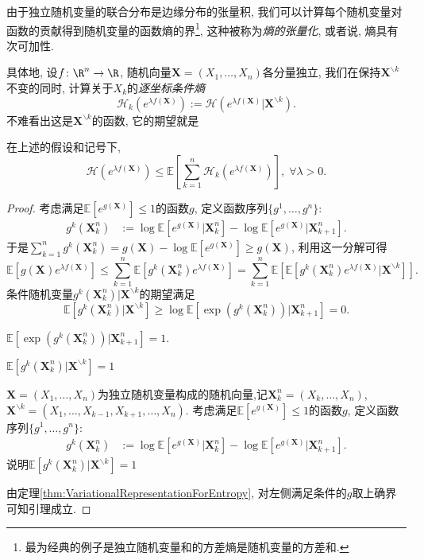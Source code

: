 由于独立随机变量的联合分布是边缘分布的张量积, 我们可以计算每个随机变量对函数的贡献得到随机变量的函数熵的界\footnote{最为经典的例子是独立随机变量和的方差熵是随机变量的方差和.}, 这种被称为\emph{熵的张量化}, 或者说, 熵具有次可加性. 


具体地, 设$f \colon \R^n \to \R$, 随机向量$\bm X = (X_1, \dots, X_n)$各分量独立, 我们在保持$\bm X^{\backslash k}$不变的同时, 计算关于$X_k$的\emph{逐坐标条件熵}
\begin{equation*}
	\mathcal{H}_k ( e^{\lambda f(\bm X)} )
	:= \mathcal{H} ( e^{\lambda f(\bm X)} | \bm X^{\backslash k} ). 
\end{equation*}
不难看出这是$\bm X^{\backslash k}$的函数, 它的期望就是

\begin{lemma}[熵的张量化]\label{lemma:EntropyTensorization}
	在上述的假设和记号下, 
	\begin{equation*}
		\mathcal{H}(e^{\lambda f(\bm X)})
		\leq \mathbb{E}\left[ \sum_{k=1}^n \mathcal{H}_k (e^{\lambda f(\bm X)}) \right],\; 
		\forall \lambda > 0. 
	\end{equation*}
\end{lemma}
\begin{proof}
	考虑满足$\mathbb{E}[e^{g(\bm X)}] \leq 1$的函数$g$, 定义函数序列$\{g^1, \dots, g^n\}$: 
	\begin{align*}
		g^k(\bm X_k^n) &:= \log \mathbb{E}[e^{g(\bm X)} | \bm X_k^n] - \log \mathbb{E}[e^{g(\bm X)} | \bm X_{k+1}^n]. 
	\end{align*}
	于是$\sum_{k=1}^n g^k(\bm X_k^n) = g(\bm X) - \log \mathbb{E}[ e^{g(\bm X)} ] \geq g(\bm X)$, 利用这一分解可得
	\begin{equation*}
		\mathbb{E}[ g(\bm X) e^{\lambda f(\bm X)}]
		\leq \sum_{k=1}^n \mathbb{E}[ g^k(\bm X_k^n) e^{\lambda f(\bm X)} ] 
		= \sum_{k=1}^n \mathbb{E}\left[ \mathbb{E}[ g^k(\bm X_k^n) e^{\lambda f(\bm X)} | \bm X^{\backslash k} ] \right]. 
	\end{equation*}
	条件随机变量$g^k(\bm X_k^n)| \bm X^{\backslash k}$的期望满足
	\begin{equation*}
		\mathbb{E}\left[ g^k(\bm X_k^n) | \bm X^{\backslash k} \right]
		\geq \log \mathbb{E}\left[ \exp(g^k(\bm X_k^n)) |\bm X_{k+1}^n \right] = 0. 
	\end{equation*}
	
	$\mathbb{E}\left[ \exp(g^k(\bm X_k^n)) |\bm X_{k+1}^n \right] = 1$. 
	
	$\mathbb{E}\left[ g^k(\bm X_k^n) | \bm X^{\backslash k} \right] = 1$
	
	\sp 
	$\bm X = (X_1, \dots, X_n)$为独立随机变量构成的随机向量,记$\bm X_k^n = (X_k, \dots, X_n)$, $\bm X^{\backslash k} = (X_1, \dots, X_{k-1}, X_{k+1}, \dots, X_n)$. 
	考虑满足$\mathbb{E}[e^{g(\bm X)}] \leq 1$的函数$g$, 定义函数序列$\{g^1, \dots, g^n\}$: 
	\begin{align*}
		g^k(\bm X_k^n) &:= \log \mathbb{E}[e^{g(\bm X)} | \bm X_k^n] - \log \mathbb{E}[e^{g(\bm X)} | \bm X_{k+1}^n]. 
	\end{align*}
	说明$\mathbb{E}\left[ g^k(\bm X_k^n) | \bm X^{\backslash k} \right] =1$
	
	由定理\ref{thm:VariationalRepresentationForEntropy}, 对左侧满足条件的$g$取上确界可知引理成立. 
\end{proof}

